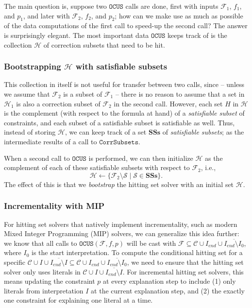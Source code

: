 \documentclass[twoside,11pt]{article}
\newcommand\m[1]{\mathcal{#1}}
\newcommand\comment[1]{\marginpar{\tiny #1}}
\renewcommand\comment[1]{#1}
\newcommand{\tias}[1]{{\comment{\color{blue}Tias:#1}}}
\newcommand\setstohit{\ensuremath{\m{H} }\xspace}
\newcommand\subsetT{\ensuremath{\m{S} }\xspace}
\newcommand\Iend{\ensuremath{I_\mathit{end} }\xspace}
\newcommand\formula{\ensuremath{\m{F} }\xspace}
\newcommand\formulac{\ensuremath{\m{C} }\xspace}
\newcommand\mm[1]{\ensuremath{#1}\xspace}
\newcommand\call[1]{\mm{\texttt{#1}}}
\newcommand\grow{\mm{\call{Grow}}}
\newcommand\comus{\mm{\call{OCUS}}}
\newcommand\corrsubsets{\mm{\call{CorrSubsets}}}
\newcommand\satsets{\mm{\mathbf{SSs}}}
\begin{document}
The main question is, suppose two \comus calls are done, first with inputs $\formula_1$, $f_1$, and $p_1$, and later with $\formula_2$, $f_2$, and $p_2$; how can we make use as much as possible of the data computations of the first call to speed-up the second call? The answer is surprisingly elegant. The most important data \comus keeps track of  is the collection \setstohit of correction subsets that need to be hit.

\subsubsection{Bootstrapping $\setstohit$ with satisfiable subsets}\label{sec:bootstrapping-sat-subsets} This collection in itself is not useful for transfer between two calls, since -- unless we assume that $\formula_2$ is a subset of $\formula_1$ -- there is no reason to assume that a set in $\setstohit_1$ is also a correction subset of $\formula_2$ in the second call. 
However, each set $H$ in $\setstohit$ is the complement (with respect to the formula at hand) of a \emph{satisfiable subset} of constraints, and each subset of a satisfiable subset is satisfiable as well.
Thus, instead of storing $\setstohit$, we can keep track of a set \satsets of \emph{satisfiable subsets}; 
as the intermediate results of a call to \corrsubsets.

When a second call to \comus is performed, we can then initialize $\setstohit$ as the complement of each of these satisfiable subsets with respect to $\formula_2$, i.e.,
 \begin{equation}
 \setstohit\gets \{\formula_2\setminus \m{S}\mid \m{S}\in \satsets\}.
 	\end{equation}
The effect of this is that we \textit{bootstrap} the hitting set solver with an initial set $\setstohit$. 

\subsubsection{Incrementality with MIP}\label{sec:mip-incrementality}  For hitting set solvers that natively implement incrementality, such as modern Mixed Integer Programming (MIP) solvers, we can generalize this idea further: we know that all calls to $\comus(\formula,f,p)$ will be cast with $\formula \subseteq \m{C}\cup \Iend \cup \overline{\Iend \setminus I_0}$, where $I_0$ is the start interpretation. 
To compute the conditional hitting set for a specific $\formulac\cup I\cup \overline{\Iend\setminus I} \subseteq \m{C}\cup \Iend \cup \overline{\Iend \setminus I_0}$, we need to ensure that the hitting set solver only uses literals in $\formulac\cup I\cup \overline{\Iend\setminus I}$. 
For incremental hitting set solvers, this means updating the constraint $p$ at every explanation step to include (1) only literals from interpretation $I$ at the current explanation step, and (2) the exactly one constraint for explaining one literal at a time.
\end{document}
